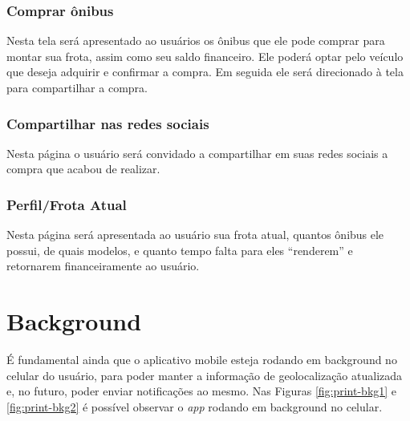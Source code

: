 \subsubsection{Comprar ônibus}
Nesta tela será apresentado ao usuários os ônibus que ele pode comprar para montar sua frota, assim como seu saldo financeiro. Ele poderá optar pelo veículo que deseja adquirir e confirmar a compra. Em seguida ele será direcionado à tela para compartilhar a compra.
    
\subsubsection{Compartilhar nas redes sociais}
Nesta página o usuário será convidado a compartilhar em suas redes sociais a compra que acabou de realizar.
    
\subsubsection{Perfil/Frota Atual}
Nesta página será apresentada ao usuário sua frota atual, quantos ônibus ele possui, de quais modelos, e quanto tempo falta para eles ``renderem'' e retornarem financeiramente ao usuário.

\section{Background}
É fundamental ainda que o aplicativo mobile esteja rodando em background no celular do usuário, para poder manter a informação de geolocalização atualizada e, no futuro, poder enviar notificações ao mesmo. Nas Figuras \ref{fig:print-bkg1} e \ref{fig:print-bkg2} é possível observar o \textit{app} rodando em background no celular.



